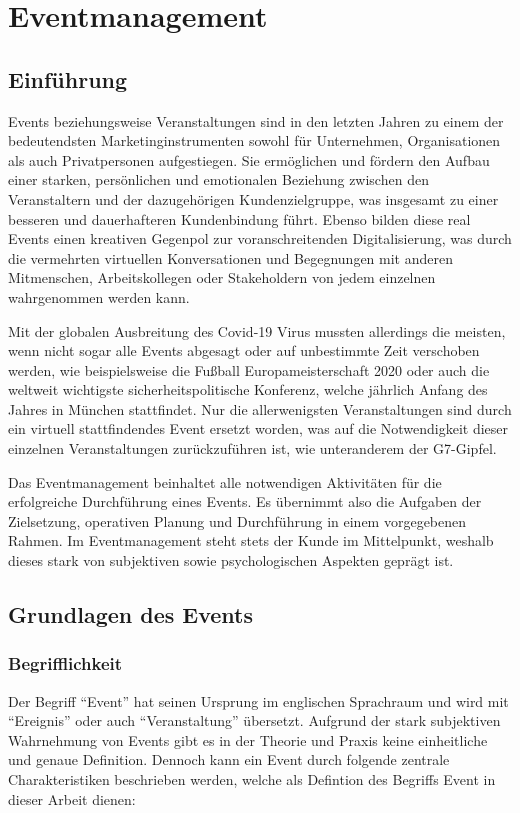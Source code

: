  \chapter{Eventmanagement}
\section{Einführung}
Events beziehungsweise Veranstaltungen sind in den letzten Jahren zu einem der bedeutendsten Marketinginstrumenten sowohl für Unternehmen, Organisationen als auch Privatpersonen aufgestiegen.
Sie ermöglichen und fördern den Aufbau einer starken, persönlichen und emotionalen Beziehung zwischen den Veranstaltern und der dazugehörigen Kundenzielgruppe, was insgesamt zu einer besseren und dauerhafteren Kundenbindung führt.
Ebenso bilden diese real Events einen kreativen Gegenpol zur voranschreitenden Digitalisierung, was durch die vermehrten virtuellen Konversationen und Begegnungen mit anderen Mitmenschen, Arbeitskollegen oder Stakeholdern von jedem einzelnen wahrgenommen werden kann.\autocite[Vgl.][]{Eventmanagementstudieren.de.o.J.}

Mit der globalen Ausbreitung des Covid-19 Virus mussten allerdings die meisten, wenn nicht sogar alle Events abgesagt oder auf unbestimmte Zeit verschoben werden, wie beispielsweise die Fußball Europameisterschaft 2020 oder auch die weltweit wichtigste sicherheitspolitische Konferenz, welche jährlich Anfang des Jahres in München stattfindet. 
Nur die allerwenigsten Veranstaltungen sind durch ein virtuell stattfindendes Event ersetzt worden, was auf die Notwendigkeit dieser einzelnen Veranstaltungen zurückzuführen ist, wie unteranderem der G7-Gipfel.\autocites[Vgl.][]{Tagesschau.o.J.}[Vgl.][]{Nahar.o.J.}[Vgl.][]{ZeitOnline.o.J.}

Das Eventmanagement beinhaltet alle notwendigen Aktivitäten für die erfolgreiche Durchführung eines Events.
Es übernimmt also die Aufgaben der Zielsetzung, operativen Planung und Durchführung in einem vorgegebenen Rahmen.
Im Eventmanagement steht stets der Kunde im Mittelpunkt, weshalb dieses stark von subjektiven sowie psychologischen Aspekten geprägt ist.\autocite[Vgl.][1]{Holzbaur.2002}

\section{Grundlagen des Events}
\subsection{Begrifflichkeit}
Der Begriff \enquote{Event} hat seinen Ursprung im englischen Sprachraum und wird mit \enquote{Ereignis} oder auch \enquote{Veranstaltung} übersetzt.
Aufgrund der stark subjektiven Wahrnehmung von Events gibt es in der Theorie und Praxis keine einheitliche und genaue Definition.
Dennoch kann ein Event durch folgende zentrale Charakteristiken beschrieben werden, welche als Defintion des Begriffs Event in dieser Arbeit dienen: 

